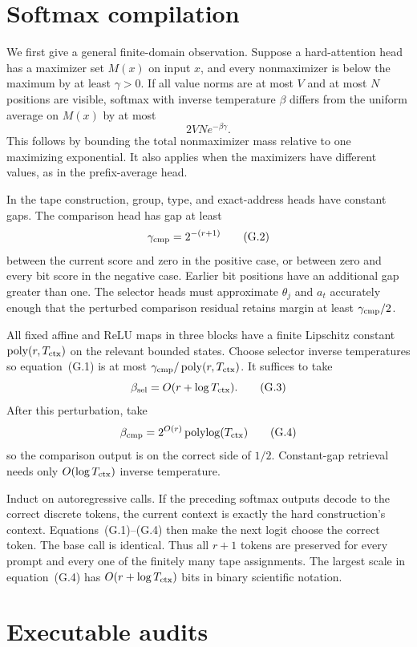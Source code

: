 \section{Softmax compilation}\label{app:softmax}

We first give a general finite-domain observation. Suppose a hard-attention head has a maximizer
set $M(x)$ on input $x$, and every nonmaximizer is below the maximum by at least $\gamma>0$.
If all value norms are at most $V$ and at most $N$ positions are visible, softmax with inverse
temperature $\beta$ differs from the uniform average on $M(x)$ by at most
\[
 2VN e^{-\beta\gamma}.
 \tag{G.1}
\]
This follows by bounding the total nonmaximizer mass relative to one maximizing exponential. It
also applies when the maximizers have different values, as in the prefix-average head.

In the tape construction, group, type, and exact-address heads have constant gaps. The comparison
head has gap at least
\[
 \gamma_{\rm cmp}=2^{-(r+1)}
 \tag{G.2}
\]
between the current score and zero in the positive case, or between zero and every bit score in the
negative case. Earlier bit positions have an additional gap greater than one. The selector heads
must approximate $\theta_j$ and $a_t$ accurately enough that the perturbed comparison residual
retains margin at least $\gamma_{\rm cmp}/2$.

All fixed affine and ReLU maps in three blocks have a finite Lipschitz constant
$\operatorname{poly}(r,T_{\rm ctx})$ on the relevant bounded states. Choose selector inverse
temperatures so equation~(G.1) is at most
$\gamma_{\rm cmp}/\operatorname{poly}(r,T_{\rm ctx})$. It suffices to take
\[
 \beta_{\rm sel}=O(r+\log T_{\rm ctx}).
 \tag{G.3}
\]
After this perturbation, take
\[
 \beta_{\rm cmp}=2^{O(r)}\operatorname{polylog}(T_{\rm ctx})
 \tag{G.4}
\]
so the comparison output is on the correct side of $1/2$. Constant-gap retrieval needs only
$O(\log T_{\rm ctx})$ inverse temperature.

Induct on autoregressive calls. If the preceding softmax outputs decode to the correct discrete
tokens, the current context is exactly the hard construction's context. Equations~(G.1)--(G.4)
then make the next logit choose the correct token. The base call is identical. Thus all $r+1$
tokens are preserved for every prompt and every one of the finitely many tape assignments. The
largest scale in equation~(G.4) has $O(r+\log T_{\rm ctx})$ bits in binary scientific notation.

\section{Executable audits}\label{app:audit}

